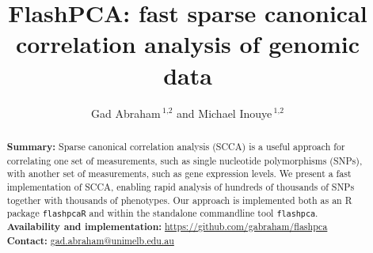 \documentclass[a4paper,10pt]{scrartcl}
\title{FlashPCA: fast sparse canonical correlation analysis of genomic data}
\author{Gad Abraham\,$^{\text{1,2}}$
and Michael Inouye\,$^{\text{1,2}}$}
\renewcommand{\href}[2]{\url{#1}}
\begin{document}
\maketitle

\begin{abstract}
\noindent
\textbf{Summary:} Sparse canonical correlation analysis (SCCA) is a
useful approach for correlating one set of measurements, such as single
nucleotide polymorphisms (SNPs), with another set of measurements, such as gene
expression levels.  We present a fast implementation of SCCA, enabling rapid
analysis of hundreds of thousands of SNPs together with thousands of phenotypes.
Our approach is implemented both as an R package \texttt{flashpcaR} and within
the standalone commandline tool \texttt{flashpca}.\\
\textbf{Availability and implementation:}
\href{https://github.com/gabraham/flashpca}{https://github.com/gabraham/flashpca}
\\ \textbf{Contact:}
\href{gad.abraham@unimelb.edu.au}{gad.abraham@unimelb.edu.au}
\end{abstract}







\end{document}
